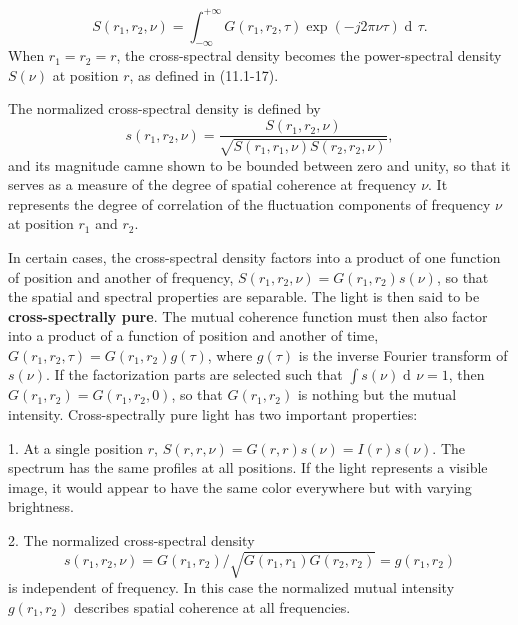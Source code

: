 \documentclass{article}
\numberwithin{figure}{subsection}
\numberwithin{table}{subsection}
\DeclareMathOperator\dif{d\!}
\begin{document}
\begin{equation}
S(r_1, r_2, \nu) = \int_{-\infty}^{+\infty}G(r_1, r_2, \tau) \exp(-j2\pi \nu \tau) \dif \tau .
\end{equation}
When $ r_1 = r_2 = r $, the cross-spectral density becomes the power-spectral density $ S(\nu) $ at position $ r $, as defined in (11.1-17).
\par The normalized cross-spectral density is defined by
\begin{equation}
s(r_1, r_2, \nu) = \frac{S(r_1, r_2, \nu)}{\sqrt{S(r_1, r_1, \nu)S(r_2, r_2, \nu)}} ,
\end{equation}
and its magnitude camne shown to be bounded between zero and unity, so that it serves as a measure of the degree of spatial coherence at frequency $ \nu $. It represents the degree of correlation of the fluctuation components of frequency $ \nu $ at position $ r_1 $ and $ r_2 $.
\par In certain cases, the cross-spectral density factors into a product of one function of position and another of frequency, $ S(r_1, r_2, \nu) = G(r_1, r_2) s(\nu) $, so that the spatial and spectral properties are separable. The light is then said to be \textbf{cross-spectrally pure}. The mutual coherence function must then also factor into a product of a function of position and another of time, $ G(r_1, r_2, \tau) = G(r_1, r_2) g(\tau) $, where $ g(\tau) $ is the inverse Fourier transform of $ s(\nu) $. If the factorization parts are selected such that $ \int s(\nu) \dif \nu = 1 $, then $ G(r_1, r_2) = G(r_1, r_2, 0) $, so that $ G(r_1, r_2) $ is nothing but the mutual intensity. Cross-spectrally pure light has two important properties:
\par 1. At a single position $ r $, $ S(r, r, \nu) = G(r, r) s(\nu) = I(r) s(\nu) $. The spectrum has the same profiles at all positions. If the light represents a visible image, it would appear to have the same color everywhere but with varying brightness.
\par 2. The normalized cross-spectral density
\begin{equation}
s(r_1, r_2, \nu) = G(r_1, r_2) / \sqrt{G(r_1, r_1) G(r_2, r_2)} = g(r_1, r_2)
\end{equation}
is independent of frequency. In this case the normalized mutual intensity $ g(r_1, r_2) $ describes spatial coherence at all frequencies.

\bigbreak\begingroup
\color{ksc}
\end{document}
